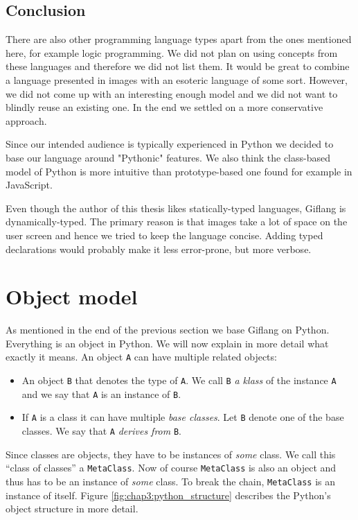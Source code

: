 \subsection{Conclusion}
There are also other programming language types apart from the ones mentioned here, for example logic programming. We did not plan on using
concepts from these languages and therefore we did not list them. It would be great to combine a language presented in images with an esoteric language
of some sort. However, we did not come up with an interesting enough model and we did not want to blindly reuse an existing one. In the end we settled on
a more conservative approach.

Since our intended audience is typically experienced in Python we decided to base our language around "Pythonic" features. We also think
the class-based model of Python is more intuitive than prototype-based one found for example in JavaScript.

Even though the author of this thesis likes statically-typed languages, Giflang is dynamically-typed. The primary reason is that images take a lot of
space on the user screen and hence we tried to keep the language concise. Adding typed declarations would probably make it less error-prone, but more verbose.

\section{Object model}
As mentioned in the end of the previous section we base Giflang on Python. Everything is an object in Python. We will now explain in more detail what exactly
it means. An object \texttt{A} can have multiple related objects:
\begin{itemize}
    \item An object \texttt{B} that denotes the type of \texttt{A}. We call \texttt{B} \emph{a klass} of the instance \texttt{A} and we say that \texttt{A}
    is an instance of \texttt{B}.
    \item If \texttt{A} is a class it can have multiple \emph{base classes}. Let \texttt{B} denote one of the base classes. We say that \texttt{A}
    \emph{derives from} \texttt{B}. 
\end{itemize}

Since classes are objects, they have to be instances of \emph{some} class. We call this ``class of classes'' a \texttt{MetaClass}. Now of course
\texttt{MetaClass} is also an object and thus has to be an instance of \emph{some} class. To break the chain, \texttt{MetaClass} is an instance of itself.
Figure \ref{fig:chap3:python_structure} describes the Python's object structure in more detail.

